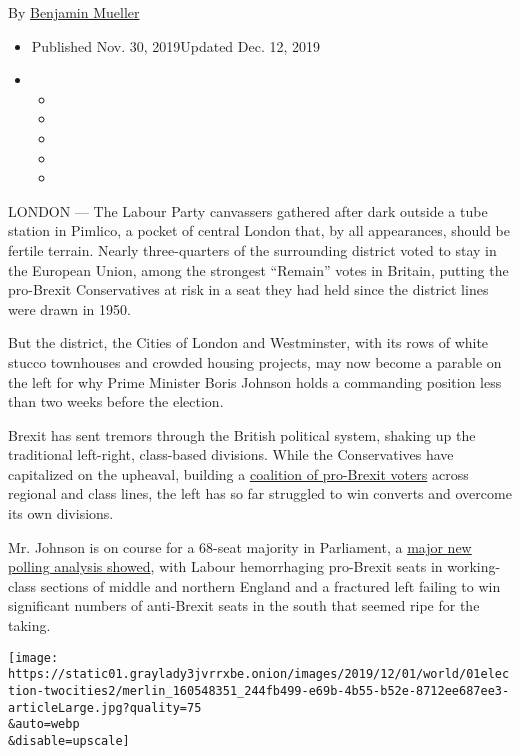 By
\href{https://www.nytimes3xbfgragh.onion/by/benjamin-mueller}{Benjamin
Mueller}

\begin{itemize}
\item
  Published Nov. 30, 2019Updated Dec. 12, 2019
\item
  \begin{itemize}
  \item
  \item
  \item
  \item
  \item
  \end{itemize}
\end{itemize}

LONDON --- The Labour Party canvassers gathered after dark outside a
tube station in Pimlico, a pocket of central London that, by all
appearances, should be fertile terrain. Nearly three-quarters of the
surrounding district voted to stay in the European Union, among the
strongest ``Remain'' votes in Britain, putting the pro-Brexit
Conservatives at risk in a seat they had held since the district lines
were drawn in 1950.

But the district, the Cities of London and Westminster, with its rows of
white stucco townhouses and crowded housing projects, may now become a
parable on the left for why Prime Minister Boris Johnson holds a
commanding position less than two weeks before the election.

Brexit has sent tremors through the British political system, shaking up
the traditional left-right, class-based divisions. While the
Conservatives have capitalized on the upheaval, building a
\href{https://www.nytimes3xbfgragh.onion/2019/11/25/world/europe/uk-election-conservatives-labour.html}{coalition
of pro-Brexit voters} across regional and class lines, the left has so
far struggled to win converts and overcome its own divisions.

Mr. Johnson is on course for a 68-seat majority in Parliament, a
\href{https://www.thetimes.co.uk/article/mrp-election-poll-boris-johnson-heads-for-big-majority-qrqsq9f7r}{major
new polling analysis showed}, with Labour hemorrhaging pro-Brexit seats
in working-class sections of middle and northern England and a fractured
left failing to win significant numbers of anti-Brexit seats in the
south that seemed ripe for the taking.

\texttt{[image: https://static01.graylady3jvrrxbe.onion/images/2019/12/01/world/01election-twocities2/merlin\_160548351\_244fb499-e69b-4b55-b52e-8712ee687ee3-articleLarge.jpg?quality=75\\\&auto=webp\\\&disable=upscale]}

